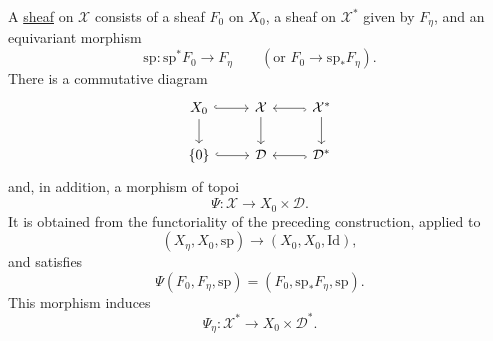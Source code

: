 A \underline{sheaf} on $\mathcal X$ consists of a sheaf $F_0$ on
$X_0$, a sheaf on $\mathcal X^*$ given by $F_\eta$, and an equivariant
morphism
\[
\mathrm{sp}:\mathrm{sp}^*F_0\longrightarrow F_\eta
\qquad
(\text{or }F_0\longrightarrow\mathrm{sp}_*F_\eta).
\]
There is a commutative diagram
\[
\begin{tikzcd}
X_0 \arrow[r, hook] \arrow[d]
  & \mathcal X \arrow[d]
  & \mathcal X^* \arrow[l, hook] \arrow[d] \\
\{0\} \arrow[r, hook]
  & \mathcal D
  & \mathcal D^* \arrow[l, hook]
\end{tikzcd}
\]
and, in addition, a morphism of topoi
\[
\Psi:\mathcal X\longrightarrow X_0\times\mathcal D.
\]
It is obtained from the functoriality of the preceding construction,
applied to
\[
(X_\eta,X_0,\mathrm{sp})
\longrightarrow(X_0,X_0,\mathrm{Id}),
\]
and satisfies
\[
\Psi(F_0,F_\eta,\mathrm{sp})
=(F_0,\mathrm{sp}_*F_\eta,\mathrm{sp}).
\]
This morphism induces
\[
\Psi_\eta:\mathcal X^*\longrightarrow X_0\times\mathcal D^*.
\]

